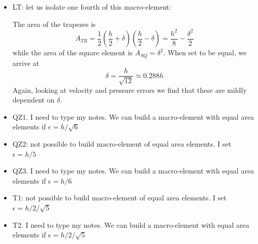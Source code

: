 \documentclass[a4paper,12pt]{article}
\begin{document}
\begin{itemize}
\item LT: let us isolate one fourth of this macro-element:

\begin{center}
\end{center}

The area of the trapezes is 
\[
A_{TR}=\frac12 (\frac{h}{2}+\delta) (\frac{h}{2}-\delta) = \frac{h^2}{8}- \frac{\delta^2}{2}
\]
while the area of the square element is $A_{SQ}=\delta^2$.
When set to be equal, we arrive at
\[
\delta = \frac{h}{\sqrt{12}} \simeq 0.288 h
\]
Again, looking at velocity and pressure errors we find that 
these are mildly dependent on $\delta$. 

\item QZ1. I need to type my notes. We can build a 
macro-element with equal area elements if $\epsilon=h/\sqrt{6}$

\item QZ2: not possible to build macro-element of equal area elements. 
I set $\epsilon=h/5$

\item QZ3. I need to type my notes. We can build a 
macro-element with equal area elements if $\epsilon=h/6$

\item T1: not possible to build macro-element of equal area elements. 
I set $\epsilon=h/2/\sqrt{5}$

\item T2. I need to type my notes. We can build a 
macro-element with equal area elements if $\epsilon=h/2/\sqrt{5}$
 
\end{itemize}


\newpage
\end{document}
